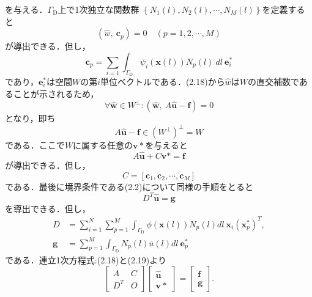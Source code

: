 \documentclass[twocolumn,head_space=15.0mm,foot_space=15.0mm,fleqn]{jlreq}
\numberwithin{equation}{section}
\begin{document}
を与える．$\Gamma_{\mathrm{D}}$上で1次独立な関数群
$\left\{ N_1 \left( l \right), N_2 \left( l \right), \cdots, N_M \left( l \right) \right\}$を定義すると
\begin{equation}
	\left( \hat{w}, \ \boldsymbol{c}_p \right) = 0 \quad \left( p=1,2, \cdots, M \right)
\end{equation}
が導出できる．但し，
\begin{equation}
	\boldsymbol{c}_p = \sum_{i=1} \int_{\Gamma_{\mathrm{D}}} \psi_i \left( \boldsymbol{x} (l) \right) N_p \left( l \right) \ dl \ \boldsymbol{e}_i^*
\end{equation}
であり，$\boldsymbol{e}_i^*$は空間$W$の第$i$単位ベクトルである．(2.18)から$\hat{w}$は$W$の直交補数であることが示されるため，
\begin{equation*}
	\forall \hat{ \boldsymbol{w} } \in W^{\perp} : \left( \hat{ \boldsymbol{w} }, \ A \hat { \boldsymbol{u} } - \boldsymbol{f} \right) = 0
\end{equation*}
となり，即ち
\begin{equation*}
	A \hat{ \boldsymbol{u} } - \boldsymbol{f} \in \left( W^{\perp} \right)^{\perp} = W
\end{equation*}
である．ここで$W$に属する任意の$\boldsymbol{v}*$を与えると
\begin{equation}
	A \hat{ \boldsymbol{u} } + C \boldsymbol{v}* = \boldsymbol{f}
\end{equation}
が導出できる．但し，
\begin{equation*}
	C = \left[ \boldsymbol{c}_1, \boldsymbol{c}_2, \cdots, \boldsymbol{c}_M \right]
\end{equation*}
である．最後に境界条件である(2.2)について同様の手順をとると
\begin{equation}
	D^T \hat{ \boldsymbol{u} } = \boldsymbol{g}
\end{equation}
を導出できる．但し，
\begin{align}
	D &= \sum_{i=1}^N \sum_{p=1}^M \int_{\Gamma_{\mathrm{D}}} \phi \left( \boldsymbol{x} (l) \right) N_p \left( l \right) dl \ 
	  \boldsymbol{x}_i \left( \boldsymbol{x}_p^* \right)^T , \\
	\boldsymbol{g} &= \sum_{p=1}^M \int_{\Gamma_{\mathrm{D}}} N_p \left( l \right) \bar{u} \left( l \right) dl \ \boldsymbol{e}_p^*
\end{align}
である．連立1次方程式:(2.18)と(2.19)より
\begin{equation}
	\begin{bmatrix} A & C \\ D^T & O \end{bmatrix}
	\begin{bmatrix} \hat{ \boldsymbol{u} } \\ \boldsymbol{v}* \end{bmatrix} =
	\begin{bmatrix} \boldsymbol{f} \\ \boldsymbol{g} \end{bmatrix} .
\end{equation}
\end{document}
